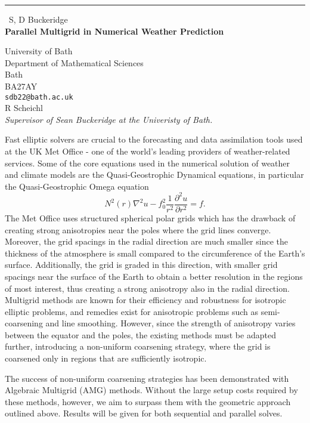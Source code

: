 \documentclass{report}
\begin{document}
\begin{center}
\rule{6in}{1pt} \
{\large S, D Buckeridge \\
{\bf Parallel Multigrid in Numerical Weather Prediction}}

University of Bath \\ Department of Mathematical Sciences \\ Bath \\ BA27AY
\\
{\tt sdb22@bath.ac.uk}\\
R Scheichl\\
{\em Supervisor of Sean Buckeridge at the Univeristy of Bath.}\end{center}

\noindent Fast elliptic solvers are crucial to the forecasting and data
assimilation tools used at the UK Met Office - one of the world's leading
providers of weather-related services. Some of the core equations used in
the numerical solution of weather and climate models are the
Quasi-Geostrophic Dynamical equations, in particular the
Quasi-Geostrophic Omega equation
\begin{displaymath}
N^2(r)\nabla^2 u-f_0^2\frac{1}{r^2}\frac{\partial^2 u}{\partial r^2}=f.
\end{displaymath}
The Met Office uses structured spherical polar grids which has the
drawback of creating strong anisotropies near the poles where the grid
lines converge. Moreover, the grid spacings in the radial direction are
much smaller since the thickness of the atmosphere is small compared to
the circumference of the Earth's surface. Additionally, the grid is
graded in this direction, with smaller grid spacings near the surface of
the Earth to obtain a better resolution in the regions of most interest,
thus creating a strong anisotropy also in the radial direction. Multigrid
methods are known for their efficiency and robustness for isotropic
elliptic problems, and remedies exist for anisotropic problems such as
semi-coarsening and line smoothing. However, since the strength of
anisotropy varies between the equator and the poles, the existing methods
must be adapted further, introducing a non-uniform coarsening strategy,
where the grid is coarsened only in regions that are sufficiently
isotropic.

The success of non-uniform coarsening strategies has been demonstrated
with Algebraic Multigrid (AMG) methods. Without the large setup costs
required by these methods, however, we aim to surpass them with the
geometric approach outlined above. Results will be given for both
sequential and parallel solves.
\end{document}
